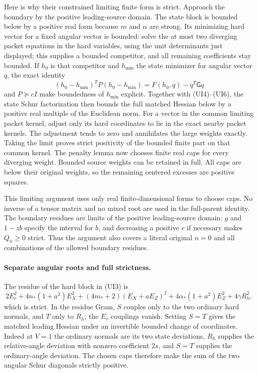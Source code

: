Here is why their constrained limiting finite form is strict.
Approach the boundary by the positive leading-source domain. The
state block is bounded below by a positive real form because $m$ and
$\alpha$ are strong. Its minimizing hard vector for a fixed angular
vector is bounded: solve the at most two diverging packet equations
in the hard variables, using the unit determinants just displayed;
this supplies a bounded competitor, and all remaining coefficients
stay bounded. If $h_0$ is that competitor and $h_{\min}$ the state
minimizer for angular vector $q$, the exact identity
\[
 (h_0-h_{\min})^TP(h_0-h_{\min})
       =F(h_0,q)-q^T\mathsf Gq
\]
and $P\succeq cI$ make boundedness of $h_{\min}$ explicit.
Together with (UI4)--(UI6), the state Schur factorization
then bounds the full matched Hessian below by a positive real multiple
of the Euclidean norm. For a vector in the common limiting packet
kernel, adjust only its hard coordinates to lie in the exact nearby
packet kernels. The adjustment tends to zero and annihilates the
large weights exactly. Taking the limit proves strict positivity of
the bounded finite part on that common kernel. The penalty lemma now
chooses finite real caps for every diverging weight. Bounded source
weights can be retained in full. All caps are below their original
weights, so the remaining centered excesses are positive squares.

This limiting argument uses only real finite-dimensional forms to
choose caps. No inverse of a tensor matrix and no mixed root are
used in the full-parent identity. The boundary residues are limits
of the positive leading-source domain: $g$ and $1-zb$ specify the
interval for $b$, and decreasing a positive $r$ if necessary makes
$Q_n\ge0$ strict. Thus the argument also covers a literal original
$n=0$ and all combinations of the allowed boundary residues.

\paragraph{Separate angular roots and full strictness.}
The residue of the hard block in (UI3) is
\[
 2E_r^2+4n_*(1+a^2)E_X^2
 +(4m_*+2)(E_X+aE_Z)^2+4\alpha_*(1+a^2)E_Z^2
 +4\gamma R_h^2,
\]
which is strict. In the residue Gram, $S$ couples only to the two
ordinary hard normals, and $T$ only to $R_h$; the $E_r$ couplings
vanish. Setting $S=T$ gives the matched leading Hessian under an
invertible bounded change of coordinates. Indeed at $V=1$ the
ordinary normals are its two state deviations, $R_h$ supplies the
relative-angle deviation with nonzero coefficient $2s$, and
$S=T$ supplies the ordinary-angle deviation. The chosen caps therefore
make the sum of the two angular Schur diagonals strictly positive.

